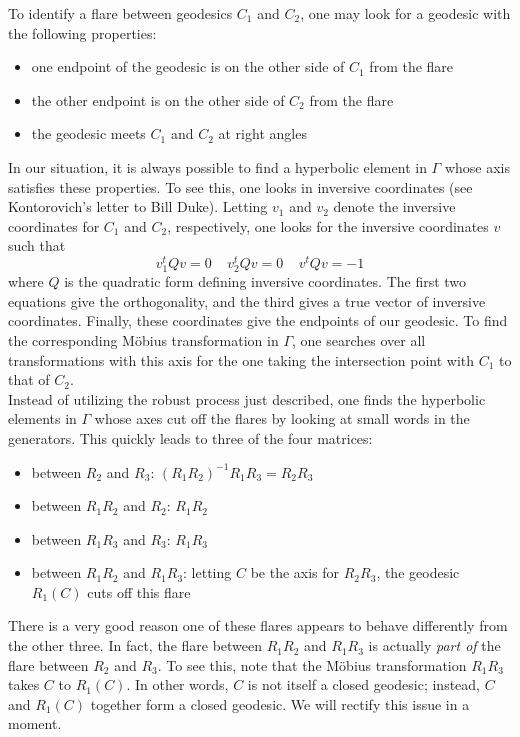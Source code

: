 \documentclass[]{article}
\begin{document}
To identify a flare between geodesics $C_1$ and $C_2$, one may look for a geodesic with the following properties:
\begin{itemize}
	\item one endpoint of the geodesic is on the other side of $C_1$ from the flare
	\item the other endpoint is on the other side of $C_2$ from the flare
	\item the geodesic meets $C_1$ and $C_2$ at right angles
\end{itemize}
In our situation, it is always possible to find a hyperbolic element in $\Gamma$ whose axis satisfies these properties.
To see this, one looks in inversive coordinates (see Kontorovich's letter to Bill Duke).
Letting $v_1$ and $v_2$ denote the inversive coordinates for $C_1$ and $C_2$, respectively, one looks for the inversive coordinates $v$ such that
$$
v_1^tQv = 0 ~~~~~ v_2^tQv = 0 ~~~~~ v^tQv = -1
$$
where $Q$ is the quadratic form defining inversive coordinates.
The first two equations give the orthogonality, and the third gives a true vector of inversive coordinates.
Finally, these coordinates give the endpoints of our geodesic.
To find the corresponding M\"obius transformation in $\Gamma$, one searches over all transformations with this axis for the one taking the intersection point with $C_1$ to that of $C_2$.
\\

Instead of utilizing the robust process just described, one finds the hyperbolic elements in $\Gamma$ whose axes cut off the flares by looking at small words in the generators.
This quickly leads to three of the four matrices:
\begin{itemize}
	\item between $R_2$ and $R_3$: $(R_1R_2)^{-1}R_1R_3 = R_2R_3$
	\item between $R_1R_2$ and $R_2$: $R_1R_2$
	\item between $R_1R_3$ and $R_3$: $R_1R_3$
	\item between $R_1R_2$ and $R_1R_3$: letting $C$ be the axis for $R_2R_3$, the geodesic $R_1(C)$ cuts off this flare
\end{itemize}
There is a very good reason one of these flares appears to behave differently from the other three.
In fact, the flare between $R_1R_2$ and $R_1R_3$ is actually \textit{part of} the flare between $R_2$ and $R_3$.
To see this, note that the M\"obius transformation $R_1R_3$ takes $C$ to $R_1(C)$.
In other words, $C$ is not itself a closed geodesic; instead, $C$ and $R_1(C)$ together form a closed geodesic.
We will rectify this issue in a moment.
\end{document}
